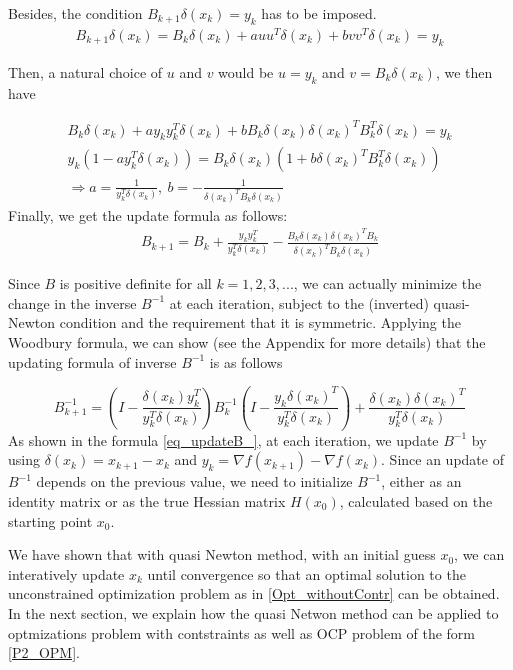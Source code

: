 \documentclass  [
  paper    = a4,
  BCOR     = 10mm,
  twoside,
  fontsize = 12pt,
  fleqn,
  toc      = bibnumbered,
  toc      = listofnumbered,
  numbers  = noendperiod,
  headings = normal,
  listof   = leveldown,
  version  = 3.03
]                                       {scrreprt}
\newcommand{\<}{\langle}
\renewcommand{\>}{\rangle}
\begin{document}
Besides, the condition $B_{k+1}\delta(x_k) = y_k$ has to be imposed.
\begin{align*}
	B_{k+1}\delta(x_k) = B_k\delta(x_k)  + a u u^T\delta(x_k) + b v v^T\delta(x_k) = y_k
\end{align*}

Then, a natural choice of $u$ and $v$ would be $u=y_k$ and $v=B_k\delta(x_k)$, we then have

\begin{align*}
	B_k\delta(x_k) + a y_ky^T_k\delta(x_k) + bB_k\delta(x_k) \delta(x_k)^TB_k^T\delta(x_k) = y_k  \\
	y_k(1-ay_k^T\delta(x_k) ) = B_k\delta(x_k)(1+ b \delta(x_k)^TB_k^T\delta(x_k)) \\
	\Rightarrow a = \frac{1}{y_k^T\delta(x_k)}, \  b= - \frac{1}{\delta(x_k)^TB_k\delta(x_k)}
\end{align*}
Finally, we get the update formula as follows: 
\begin{align*}
	B_{k+1} = B_k +  \frac{y_ky_k^T}{y_k^T\delta(x_k)}  - \frac{B_k\delta(x_k)\delta(x_k)^TB_k}{\delta(x_k)^TB_k\delta(x_k)}
\end{align*}

Since $B$ is positive definite for all $k = 1,2, 3, ...$, we can actually minimize the change in the inverse $B^{-1}$ at each iteration, subject to the (inverted) quasi-Newton condition and the requirement that it is symmetric. Applying the Woodbury formula, we can show (see the Appendix for more details) that the updating formula of inverse $B^{-1}$ is as follows

\begin{equation}
	B_{k+1}^{-1} = (I - \frac{\delta(x_k)y_k^T}{y_k^T\delta(x_k)})B_k^{-1}(I - \frac{y_k\delta(x_k)^T}{y_k^T\delta(x_k)}) +  \frac{\delta(x_k)\delta(x_k)^T}{y_k^T\delta(x_k)} 
	\label{eq_updateB_}
\end{equation}
As shown in the formula \ref{eq_updateB_}, at each iteration, we update $B^{-1}$ by using  $\delta(x_k) = x_{k+1} -x_k$ and $y_k = \nabla f(x_{k+1}) - \nabla f(x_k)$. Since an update of $B^{-1}$ depends on the previous value, we need to initialize $B^{-1}$, either as an identity matrix or as the true Hessian matrix $H(x_0)$, calculated based on the starting point $x_0$.


We have shown that with quasi Newton method, with an initial guess $x_0$,  we can interatively update $x_k$ until convergence so that an optimal solution to the unconstrained optimization problem as in \ref{Opt_withoutContr} can be obtained. In the next section, we explain how the quasi Netwon method can be applied to optmizations problem with contstraints as well as OCP problem of the form \ref{P2_OPM}.
\end{document}
